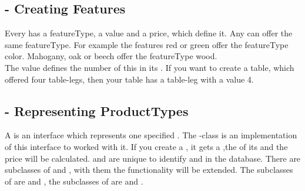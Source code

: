 \subsection{ - Creating Features}
Every  has a featureType, a value and a price, which define it. Any {} can offer the same featureType. For example the features red or green 
offer the featureType color. Mahogany, oak or beech offer the featureType wood.\\
The value defines the number of this  in its . If you want to create a table, which offered four table-legs, then your table has a  
table-leg with a value 4.   

\subsection{ - Representing ProductTypes}
A  is an interface which represents one specified . The -class is an implementation of this interface to worked with it.
If you create a , it gets a  ,the  of its  and the price will be calculated.
 and  are unique  to identify  and  in the database. 
There are subclasses of  and , with them the functionality will be extended. The subclasses of  are  and 
, the subclasses of  are  and . 


